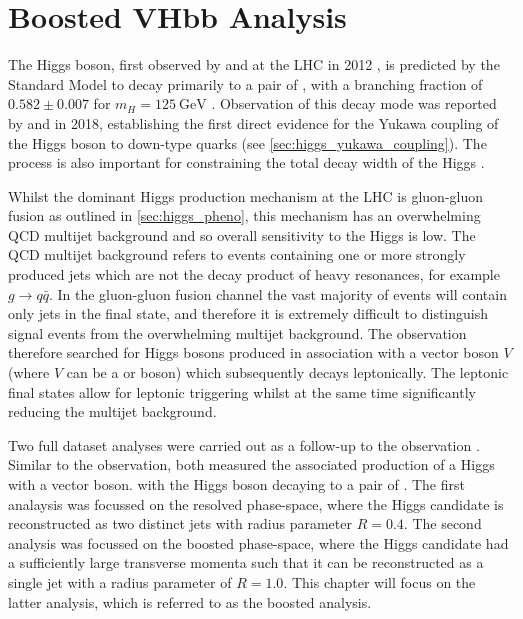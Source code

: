 
\chapter{Boosted VHbb Analysis}\label{chap:vhbb_boosted}

The Higgs boson, first observed by \ATLAS and \CMS at the LHC in 2012 \cite{HIGG-2012-27,CMS-HIG-12-028}, is predicted by the Standard Model to decay primarily to a pair of \bquarks, with a branching fraction of $0.582 \pm 0.007$ for $m_H = \SI{125}{\GeV}$ \cite{deFlorian:2016spz}. 
Observation of this decay mode was reported by \ATLAS \cite{HIGG-2018-04} and \CMS \cite{CMS-HIG-18-016} in 2018, establishing the first direct evidence for the Yukawa coupling of the Higgs boson to down-type quarks (see \cref{sec:higgs_yukawa_coupling}).
The \Hbb process is also important for constraining the total decay width of the Higgs \cite{Lafaye:2009vr}.

Whilst the dominant Higgs production mechanism at the LHC is gluon-gluon fusion as outlined in \cref{sec:higgs_pheno}, this mechanism has an overwhelming QCD multijet background and so overall sensitivity to the Higgs is low.
The QCD multijet background refers to events containing one or more strongly produced jets which are not the decay product of heavy resonances, for example $g \to q\bar{q}$.
In the \Hbb gluon-gluon fusion channel the vast majority of events will contain only jets in the final state, and therefore it is extremely difficult to distinguish signal events from the overwhelming multijet background.
The \hbb observation therefore searched for Higgs bosons produced in association with a vector boson $V$ (where $V$ can be a \Wboson or \Zboson boson) which subsequently decays leptonically.
The leptonic final states allow for leptonic triggering whilst at the same time significantly reducing the multijet background.

Two full \runtwo dataset analyses were carried out as a follow-up to the \Hbb observation \cite{HIGG-2018-04}.
Similar to the observation, both measured the associated production of a Higgs with a vector boson. with the Higgs boson decaying to a pair of \bquarks.
The first analaysis \cite{HIGG-2018-51} was focussed on the resolved phase-space, where the Higgs candidate is reconstructed as two distinct jets with radius parameter $R = 0.4$.
The second analysis \cite{HIGG-2018-52} was focussed on the boosted phase-space, where the Higgs candidate had a sufficiently large transverse momenta such that it can be reconstructed as a single jet with a radius parameter of $R = 1.0$.
This chapter will focus on the latter analysis, which is referred to as the boosted \VHbb analysis.

